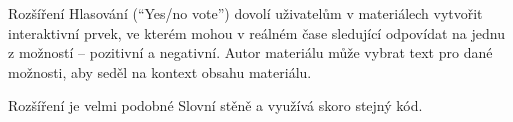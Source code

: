 Rozšíření Hlasování (\enquote{Yes/no vote}) dovolí uživatelům v materiálech vytvořit interaktivní prvek, ve kterém mohou v reálném čase sledující odpovídat na jednu z možností -- pozitivní a negativní.
Autor materiálu může vybrat text pro dané možnosti, aby seděl na kontext obsahu materiálu.

Rozšíření je velmi podobné Slovní stěně a využívá skoro stejný kód.












